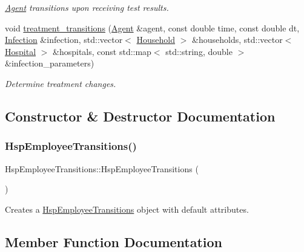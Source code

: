 \begin{DoxyCompactItemize}
\begin{DoxyCompactList}\small\item\em \hyperlink{classAgent}{Agent} transitions upon receiving test results. \end{DoxyCompactList}\item 
void \hyperlink{classHspEmployeeTransitions_a9aa0351e356529e3125a45128d7b330b}{treatment\+\_\+transitions} (\hyperlink{classAgent}{Agent} \&agent, const double time, const double dt, \hyperlink{classInfection}{Infection} \&infection, std\+::vector$<$ \hyperlink{classHousehold}{Household} $>$ \&households, std\+::vector$<$ \hyperlink{classHospital}{Hospital} $>$ \&hospitals, const std\+::map$<$ std\+::string, double $>$ \&infection\+\_\+parameters)
\begin{DoxyCompactList}\small\item\em Determine treatment changes. \end{DoxyCompactList}\end{DoxyCompactItemize}


\subsection{Constructor \& Destructor Documentation}
\mbox{\label{classHspEmployeeTransitions_ad576fd4585e25c7cfce54de937321dbd}} 
\subsubsection{\texorpdfstring{Hsp\+Employee\+Transitions()}{HspEmployeeTransitions()}}
{\footnotesize\ttfamily Hsp\+Employee\+Transitions\+::\+Hsp\+Employee\+Transitions (\begin{DoxyParamCaption}{ }\end{DoxyParamCaption})\hspace{0.3cm}{\ttfamily [default]}}



Creates a \hyperlink{classHspEmployeeTransitions}{Hsp\+Employee\+Transitions} object with default attributes. 



\subsection{Member Function Documentation}
\mbox{\label{classHspEmployeeTransitions_a1d046fe275f90ab477f31f8c0707fe16}} 
